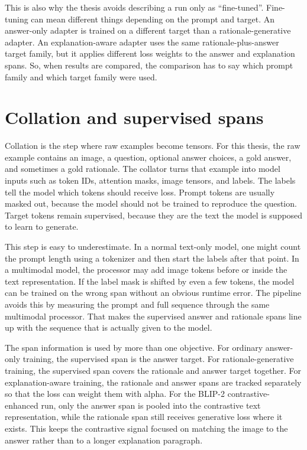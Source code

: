 This is also why the thesis avoids describing a run only as ``fine-tuned''.
Fine-tuning can mean different things depending on the prompt and target.
An answer-only adapter is trained on a different target than a rationale-generative adapter.
An explanation-aware adapter uses the same rationale-plus-answer target family, but it applies different loss weights to the answer and explanation spans.
So, when results are compared, the comparison has to say which prompt family and which target family were used.

\section{Collation and supervised spans}
Collation is the step where raw examples become tensors.
For this thesis, the raw example contains an image, a question, optional answer choices, a gold answer, and sometimes a gold rationale.
The collator turns that example into model inputs such as token IDs, attention masks, image tensors, and labels.
The labels tell the model which tokens should receive loss.
Prompt tokens are usually masked out, because the model should not be trained to reproduce the question.
Target tokens remain supervised, because they are the text the model is supposed to learn to generate.

This step is easy to underestimate.
In a normal text-only model, one might count the prompt length using a tokenizer and then start the labels after that point.
In a multimodal model, the processor may add image tokens before or inside the text representation.
If the label mask is shifted by even a few tokens, the model can be trained on the wrong span without an obvious runtime error.
The pipeline avoids this by measuring the prompt and full sequence through the same multimodal processor.
That makes the supervised answer and rationale spans line up with the sequence that is actually given to the model.

The span information is used by more than one objective.
For ordinary answer-only training, the supervised span is the answer target.
For rationale-generative training, the supervised span covers the rationale and answer target together.
For explanation-aware training, the rationale and answer spans are tracked separately so that the loss can weight them with alpha.
For the BLIP-2 contrastive-enhanced run, only the answer span is pooled into the contrastive text representation, while the rationale span still receives generative loss where it exists.
This keeps the contrastive signal focused on matching the image to the answer rather than to a longer explanation paragraph.

